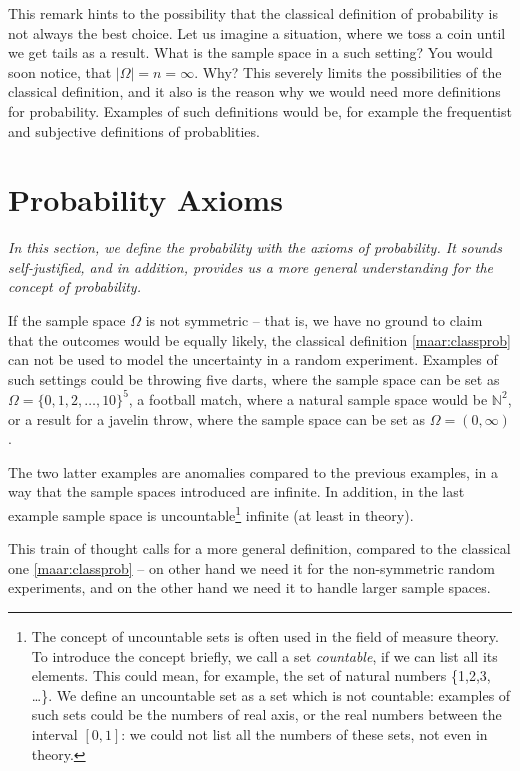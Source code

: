 \documentclass[12pt,a4paper,leqno]{report}
\newcommand{\N}{\mathbb{N}}
\theoremstyle{plain}
\theoremstyle{definition}
\begin{document}
This remark hints to the possibility that the classical definition of probability is not always the best choice. Let us imagine a situation, where we toss a coin until we get tails as a result. What is the sample space in a such setting? You would soon notice, that $|\Omega| = n =  \infty$. Why? This severely limits the possibilities of the classical definition, and it also is the reason why we would need more definitions for probability. Examples of such definitions would be, for example the frequentist and subjective definitions of probablities. 


\section{Probability Axioms}\label{axioms}

\emph{In this section, we define the probability with the axioms of probability. It sounds self-justified, and in addition, provides us a more general understanding for the concept of probability.}

If the sample space $\Omega$ is not symmetric -- that is, we have no ground to claim that the outcomes would be equally likely, the classical definition \ref{maar:classprob} can not be used to model the uncertainty in a random experiment. Examples of such settings could be throwing five darts, where the sample space can be set as $\Omega = \{0,1,2, \dots, 10\}^5$, a football match, where a natural sample space would be $\N^2$, or a result for a javelin throw, where the sample space can be set as $\Omega = (0, \infty)$.

The two latter examples are anomalies compared to the previous examples, in a way that the sample spaces introduced are infinite. In addition, in the last example sample space is uncountable\footnote{The concept of uncountable sets is often used in the field of measure theory. To introduce the concept briefly, we call a set \emph{countable}, if we can list all its elements. This could mean, for example, the set of natural numbers \{1,2,3, \ldots\}. We define an uncountable set as a set which is not countable: examples of such sets could be the numbers of real axis, or the real numbers between the interval $[0,1]$: we could not list all the numbers of these sets, not even in theory.} infinite (at least in theory).

This train of thought calls for a more general definition, compared to the classical one \ref{maar:classprob} -- on other hand we need it for the non-symmetric random experiments, and on the other hand we need it to handle larger sample spaces.
\end{document}
